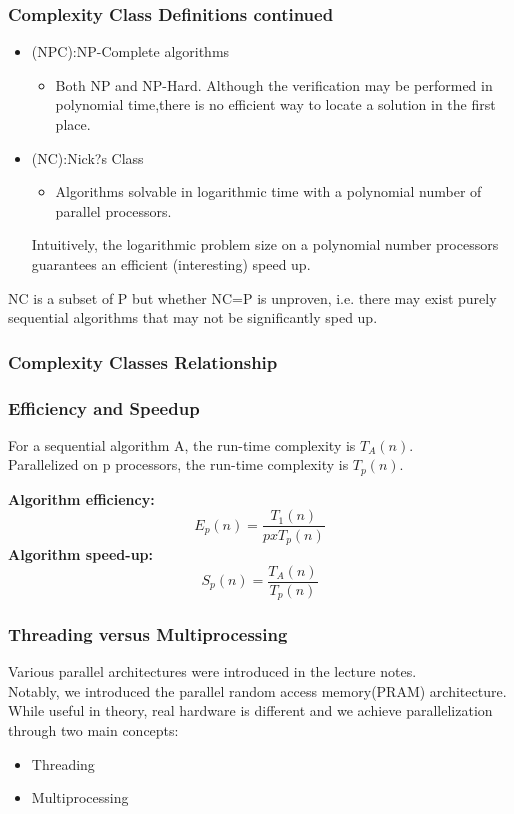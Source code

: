 \documentclass{beamer}
\begin{document}
\begin{frame}
\frametitle{Complexity Class Definitions continued}
\begin{itemize}

\item (NPC):NP-Complete algorithms
\begin{itemize}
\item Both NP and NP-Hard. Although the verification may be performed in polynomial time,there is no efficient way to locate a solution in the first place.
\end{itemize}

\item (NC):Nick?s Class
\begin{itemize}
\item Algorithms solvable in logarithmic time with a polynomial number of parallel processors. 
\end{itemize}
{\small Intuitively, the logarithmic problem size on a polynomial number processors guarantees an efficient (interesting) speed up.}
\end{itemize}
NC is a subset of P but whether NC=P is unproven, i.e.  there may exist purely sequential algorithms that may not be significantly sped up.
\end{frame}

\begin{frame}
\frametitle{Complexity Classes Relationship}
 
\begin{figure}
\end{figure}
\end{frame}

 \begin{frame}
 \frametitle{Efficiency and Speedup}
 
 For a sequential algorithm A, the run-time complexity is $T_{A}(n)$.\\
 Parallelized on p processors, the run-time complexity is  $T_{p}(n)$.\\
 \vspace{1cm}
 
\textbf{ Algorithm efficiency: }$$E_{p}(n)=\frac{T_{1}(n)}{pxT_{p}(n)} $$
\textbf{ Algorithm speed-up:}$$S_{p}(n)=\frac{T_{A}(n)}{T_{p}(n)}$$
 \end{frame}


\begin{frame}
 \frametitle{Threading versus Multiprocessing}
Various parallel architectures were introduced in the lecture notes. \\
Notably, we introduced the parallel random access memory(PRAM) architecture.  While useful in theory, real hardware is different and we achieve parallelization through two main concepts: 
\begin{itemize}
\item Threading
\item Multiprocessing
\end{itemize}
\end{frame}
\end{document}
